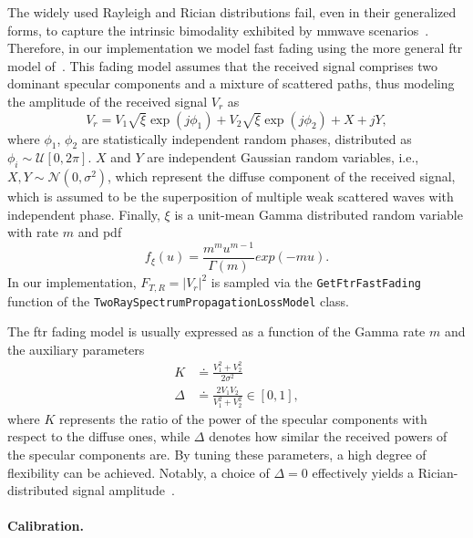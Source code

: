 The widely used Rayleigh and Rician distributions fail, even in their generalized forms, to capture the intrinsic bimodality exhibited by \gls{mmwave} scenarios~\cite{yacoub2007kappa, cotton2014human, mavridis2015near}.
Therefore, in our implementation we model fast fading using the more general \gls{ftr} model of~\cite{7917287}. %
This fading model assumes that the received signal comprises two dominant specular components and a mixture of scattered paths, thus modeling the amplitude of the received signal $V_r$ as
\begin{equation}
   V_r = V_1 \sqrt{\xi} \exp(j \phi_1) + V_2 \sqrt{\xi} \exp(j \phi_2) + X + jY,
\end{equation}
where $\phi_1$, $\phi_2$ are statistically independent random phases, distributed as $\phi_{i} \sim \mathcal{U} \left[ 0, 2\pi\right]$. $X$ and $Y$ are independent Gaussian random variables, i.e., $X, Y \sim \mathcal{N} (0, \sigma^2)$, which represent the diffuse component of the received signal, which is assumed to be the superposition of multiple weak scattered waves with independent phase. Finally, $\xi$ is a unit-mean Gamma distributed random variable with rate $m$ and \gls{pdf}
\begin{equation}
   f_{\xi} (u) = \frac{m^m u^{m-1}}{\Gamma (m)} exp(-m u).
\end{equation}
In our implementation, $F_{T, R} = \left| V_r \right|^2$ is sampled via the \texttt{Get\-Ftr\-Fast\-Fading} function of the \texttt{Two\-Ray\-Spectrum\-Propagation\-Loss\-Model} class.

The \gls{ftr} fading model is usually expressed as a function of the Gamma rate $m$ and the auxiliary parameters
\begin{align}
    K &\doteq \frac{V_1^2 + V_2^2}{2 \sigma^2} \\
    \Delta &\doteq \frac{2 V_1 V_2}{V_1^2 + V_2^2} \in \left[ 0, 1 \right],
\end{align}
where $K$ represents the ratio of the power of the specular components with respect to the diffuse ones, while $\Delta$ denotes how similar the received powers of the specular components are. By tuning these parameters, a high degree of flexibility can be achieved. Notably, a choice of $\Delta = 0$ effectively yields a Rician-distributed signal amplitude~\cite{7917287}.

\paragraph{Calibration.}

